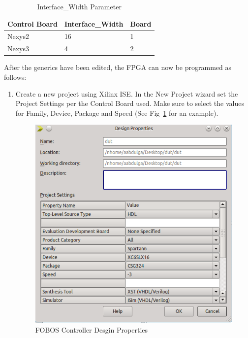 \begin{table}[H]
  \begin{center}
    \caption{\label{tab:interface-width}Interface\_Width Parameter}
    \begin{tabular}{|p{4cm}|p{2cm}|p{2cm}|}
    	\hline
       Control Board & Interface\_Width & Board\\ \hline
       Nexys2 & 16 & 1 \\ \hline
       Nexys3 & 4 & 2 \\ \hline
  \end{tabular}
  \end{center}
\end{table} 
After the generics have been edited, the FPGA can now be programmed as follows:
\begin{enumerate}
  \item Create a new project using Xilinx ISE. In the New Project wizard set the Project Settings per the Control Board used. Make sure to select the values for Family, Device, Package and Speed (See Fig~\ref{fig:ctrl-design-properties} for an example).
  		\begin{figure}[H]
		\begin{center}
		\includegraphics[scale=0.6]{figures/ctrl-design-properties}
		\caption{\label{fig:ctrl-design-properties}FOBOS Controller Desgin Properties}
		\end{center}

\end{figure}
\end{enumerate}

